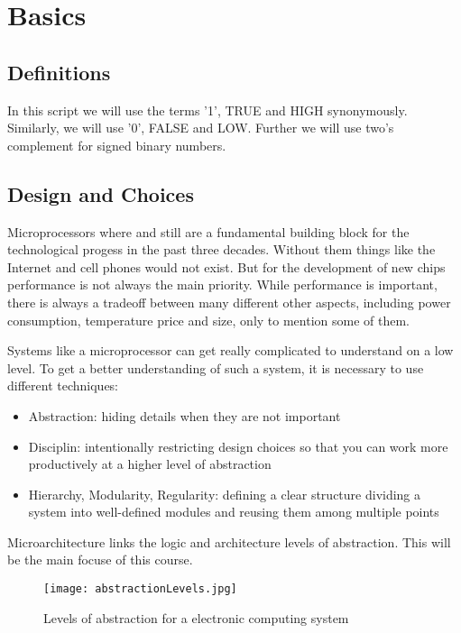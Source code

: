 \chapter{Basics}

\section{Definitions}

In this script we will use the terms '1', TRUE and HIGH synonymously. Similarly, we will use '0', FALSE and LOW. Further 
we will use two's complement for signed binary numbers.

\section{Design and Choices}

Microprocessors where and still are a fundamental building block for the technological progess in the past
three decades. Without them things like the Internet and cell phones would not exist. But for the
development of new chips performance is not always the main priority. While performance is important,
there is always a tradeoff between many different other aspects, including power consumption, temperature
price and size, only to mention some of them.

Systems like a microprocessor can get really complicated to understand on a low level. To get a better
understanding of such a system, it is necessary to use different techniques:
\begin{itemize}
    \item Abstraction: hiding details when they are not important
    \item Disciplin: intentionally restricting design choices so that you can work more productively at a higher level of abstraction
    \item Hierarchy, Modularity, Regularity: defining a clear structure dividing a system into well-defined modules and reusing them among multiple points
\end{itemize} 

Microarchitecture links the logic and architecture levels of abstraction. This will be the main focuse of this course.

\begin{figure}[h]
    \centering
    \texttt{[image: abstractionLevels.jpg]}
    \caption{Levels of abstraction for a electronic computing system}
\end{figure}

